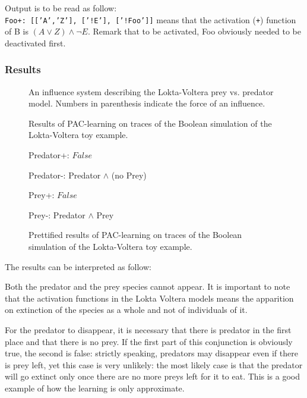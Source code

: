 \documentclass{llncs}
\begin{document}
Output is to be read as follow:\\
\texttt{Foo+:~[['A','Z'],~['!E'],~['!Foo']]} means that the activation (\texttt{+}) function of B is $(A \vee Z)\wedge\neg E$. Remark that to be activated, Foo obviously needed to be deactivated first.

\subsubsection{Results}

\begin{figure}[htp]
	
	\vspace{-1em}
	\caption{An influence system describing the Lokta-Voltera prey vs. predator model. Numbers in parenthesis indicate the force of an influence. \label{bool-LV}}
\end{figure}
\begin{figure}[htp]
	
	\vspace{-1em}
	\caption{Results of PAC-learning on traces of the Boolean simulation of the Lokta-Voltera toy example.\label{bool-LV.res}}
\end{figure}
\begin{figure}[htp]
	\ttfamily
	Predator+: $False$
	
	Predator-: Predator $\wedge$ (no Prey)
	
	Prey+: $False$
	
	Prey-: Predator $\wedge$ Prey
	\rmfamily
	\caption{Prettified results of PAC-learning on traces of the Boolean simulation of the Lokta-Voltera toy example.\label{bool-LV.res.pretty}}
\end{figure}
\pagebreak
The results can be interpreted as follow:

Both the predator and the prey species cannot appear. It is important to note that the activation functions in the Lokta Voltera models means the apparition on extinction of the species as a whole and not of individuals of it.

For the predator to disappear, it is necessary that there is predator in the first place and that there is no prey. If the first part of this conjunction is obviously true, the second is false: strictly speaking, predators may disappear even if there is prey left, yet this case is very unlikely: the most likely case is that the predator will go extinct only once there are no more preys left for it to eat. This is a good example of how the learning is only approximate.
\end{document}
